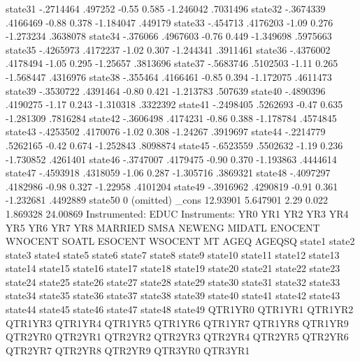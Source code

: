      state31 {\VBAR}  -.2714464    .497252    -0.55   0.585    -1.246042    .7031496
     state32 {\VBAR}  -.3674339   .4166469    -0.88   0.378    -1.184047     .449179
     state33 {\VBAR}   -.454713   .4176203    -1.09   0.276    -1.273234    .3638078
     state34 {\VBAR}   -.376066   .4967603    -0.76   0.449    -1.349698    .5975663
     state35 {\VBAR}  -.4265973   .4172237    -1.02   0.307    -1.244341    .3911461
     state36 {\VBAR}  -.4376002   .4178494    -1.05   0.295     -1.25657    .3813696
     state37 {\VBAR}  -.5683746   .5102503    -1.11   0.265    -1.568447    .4316976
     state38 {\VBAR}   -.355464   .4166461    -0.85   0.394    -1.172075    .4611473
     state39 {\VBAR}  -.3530722   .4391464    -0.80   0.421    -1.213783     .507639
     state40 {\VBAR}  -.4890396   .4190275    -1.17   0.243    -1.310318    .3322392
     state41 {\VBAR}  -.2498405   .5262693    -0.47   0.635    -1.281309    .7816284
     state42 {\VBAR}  -.3606498   .4174231    -0.86   0.388    -1.178784    .4574845
     state43 {\VBAR}  -.4253502   .4170076    -1.02   0.308     -1.24267    .3919697
     state44 {\VBAR}  -.2214779   .5262165    -0.42   0.674    -1.252843    .8098874
     state45 {\VBAR}  -.6523559   .5502632    -1.19   0.236    -1.730852    .4261401
     state46 {\VBAR}  -.3747007   .4179475    -0.90   0.370    -1.193863    .4444614
     state47 {\VBAR}  -.4593918   .4318059    -1.06   0.287    -1.305716    .3869321
     state48 {\VBAR}  -.4097297   .4182986    -0.98   0.327     -1.22958    .4101204
     state49 {\VBAR}  -.3916962   .4290819    -0.91   0.361    -1.232681    .4492889
     state50 {\VBAR}          0  (omitted)
       _cons {\VBAR}   12.93901   5.647901     2.29   0.022     1.869328    24.00869
Instrumented:  EDUC
Instruments:   YR0 YR1 YR2 YR3 YR4 YR5 YR6 YR7 YR8 MARRIED SMSA NEWENG
               MIDATL ENOCENT WNOCENT SOATL ESOCENT WSOCENT MT AGEQ AGEQSQ
               state1 state2 state3 state4 state5 state6 state7 state8
               state9 state10 state11 state12 state13 state14 state15
               state16 state17 state18 state19 state20 state21 state22
               state23 state24 state25 state26 state27 state28 state29
               state30 state31 state32 state33 state34 state35 state36
               state37 state38 state39 state40 state41 state42 state43
               state44 state45 state46 state47 state48 state49 QTR1YR0
               QTR1YR1 QTR1YR2 QTR1YR3 QTR1YR4 QTR1YR5 QTR1YR6 QTR1YR7
               QTR1YR8 QTR1YR9 QTR2YR0 QTR2YR1 QTR2YR2 QTR2YR3 QTR2YR4
               QTR2YR5 QTR2YR6 QTR2YR7 QTR2YR8 QTR2YR9 QTR3YR0 QTR3YR1
